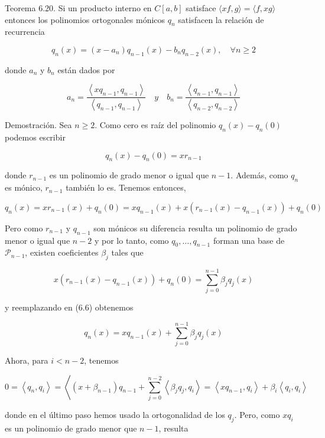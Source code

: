 \documentclass[10pt]{article}
\begin{document}
Teorema 6.20. Si un producto interno en $C[a, b]$ satisface $\langle x f, g\rangle=\langle f, x g\rangle$ entonces los polinomios ortogonales mónicos $q_{n}$ satisfacen la relación de recurrencia


\begin{equation*}
q_{n}(x)=\left(x-a_{n}\right) q_{n-1}(x)-b_{n} q_{n-2}(x), \quad \forall n \geq 2 \tag{6.5}
\end{equation*}


donde $a_{n}$ y $b_{n}$ están dados por

$$
a_{n}=\frac{\left\langle x q_{n-1}, q_{n-1}\right\rangle}{\left\langle q_{n-1}, q_{n-1}\right\rangle} \quad y \quad b_{n}=\frac{\left\langle q_{n-1}, q_{n-1}\right\rangle}{\left\langle q_{n-2}, q_{n-2}\right\rangle}
$$

Demostración. Sea $n \geq 2$. Como cero es raíz del polinomio $q_{n}(x)-q_{n}(0)$ podemos escribir

$$
q_{n}(x)-q_{n}(0)=x r_{n-1}
$$

donde $r_{n-1}$ es un polinomio de grado menor o igual que $n-1$. Además, como $q_{n}$ es mónico, $r_{n-1}$ también lo es. Tenemos entonces,


\begin{equation*}
q_{n}(x)=x r_{n-1}(x)+q_{n}(0)=x q_{n-1}(x)+x\left(r_{n-1}(x)-q_{n-1}(x)\right)+q_{n}(0) \tag{6.6}
\end{equation*}


Pero como $r_{n-1}$ y $q_{n-1}$ son mónicos su diferencia resulta un polinomio de grado menor o igual que $n-2$ y por lo tanto, como $q_{0}, \ldots, q_{n-1}$ forman una base de $\mathcal{P}_{n-1}$, existen coeficientes $\beta_{j}$ tales que

$$
x\left(r_{n-1}(x)-q_{n-1}(x)\right)+q_{n}(0)=\sum_{j=0}^{n-1} \beta_{j} q_{j}(x)
$$

y reemplazando en (6.6) obtenemos


\begin{equation*}
q_{n}(x)=x q_{n-1}(x)+\sum_{j=0}^{n-1} \beta_{j} q_{j}(x) \tag{6.7}
\end{equation*}


Ahora, para $i<n-2$, tenemos

$$
0=\left\langle q_{n}, q_{i}\right\rangle=\left\langle\left(x+\beta_{n-1}\right) q_{n-1}+\sum_{j=0}^{n-2}\left\langle\beta_{j} q_{j}, q_{i}\right\rangle=\left\langle x q_{n-1}, q_{i}\right\rangle+\beta_{i}\left\langle q_{i}, q_{i}\right\rangle\right.
$$

donde en el último paso hemos usado la ortogonalidad de los $q_{j}$. Pero, como $x q_{i}$ es un polinomio de grado menor que $n-1$, resulta
\end{document}
